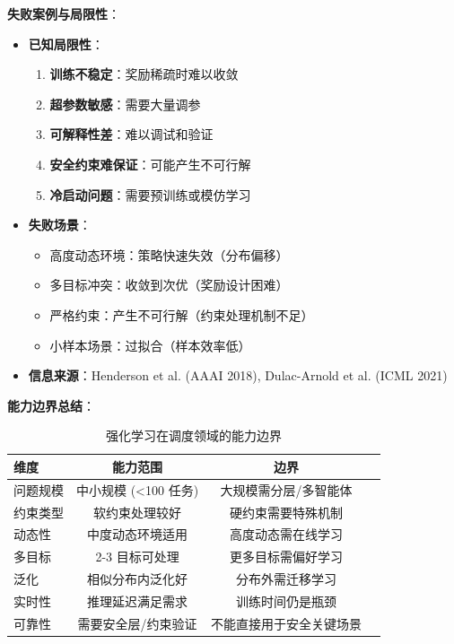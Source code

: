 \documentclass[12pt,a4paper]{article}
\begin{document}
\textbf{失败案例与局限性}：

\begin{itemize}
    \item \textbf{已知局限性}：
    \begin{enumerate}
        \item \textbf{训练不稳定}：奖励稀疏时难以收敛
        \item \textbf{超参数敏感}：需要大量调参
        \item \textbf{可解释性差}：难以调试和验证
        \item \textbf{安全约束难保证}：可能产生不可行解
        \item \textbf{冷启动问题}：需要预训练或模仿学习
    \end{enumerate}
    
    \item \textbf{失败场景}：
    \begin{itemize}
        \item 高度动态环境：策略快速失效（分布偏移）
        \item 多目标冲突：收敛到次优（奖励设计困难）
        \item 严格约束：产生不可行解（约束处理机制不足）
        \item 小样本场景：过拟合（样本效率低）
    \end{itemize}
    
    \item \textbf{信息来源}：Henderson et al. (AAAI 2018)\cite{henderson2018deep}, Dulac-Arnold et al. (ICML 2021)\cite{dulac2021challenges}
\end{itemize}

\textbf{能力边界总结}：

\begin{table}[h]
\centering
\caption{强化学习在调度领域的能力边界}
\label{tab:rl-boundary}
\begin{tabular}{@{}lccl@{}}
\toprule
\textbf{维度} & \textbf{能力范围} & \textbf{边界} \\
\midrule
问题规模 & 中小规模 (<100 任务) & 大规模需分层/多智能体 \\
约束类型 & 软约束处理较好 & 硬约束需要特殊机制 \\
动态性 & 中度动态环境适用 & 高度动态需在线学习 \\
多目标 & 2-3 目标可处理 & 更多目标需偏好学习 \\
泛化 & 相似分布内泛化好 & 分布外需迁移学习 \\
实时性 & 推理延迟满足需求 & 训练时间仍是瓶颈 \\
可靠性 & 需要安全层/约束验证 & 不能直接用于安全关键场景 \\
\bottomrule
\end{tabular}
\end{table}
\end{document}
